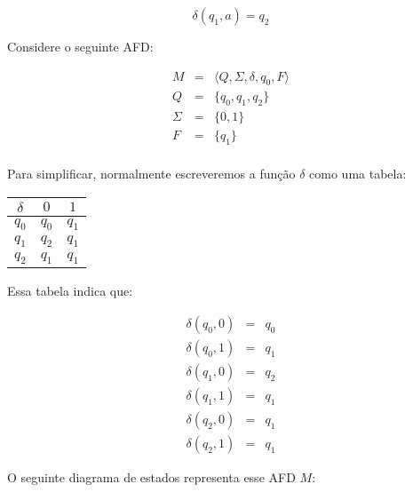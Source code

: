 \begin{center}
\end{center}

\begin{displaymath}
  \delta(q_1, a) = q_2
\end{displaymath}


\begin{example}
  Considere o seguinte AFD:

  \begin{eqnarray*}
    M & = & \langle Q, \Sigma, \delta, q_0, F \rangle\\
    Q & = & \{q_0, q_1, q_2\}\\
    \Sigma & = & \{0,1\}\\
    F & = & \{q_1\}\\
  \end{eqnarray*}

  Para simplificar, normalmente escreveremos a função $\delta$ como uma tabela:

  \begin{center}
  \begin{tabular}{c|cc}
    $\delta$ & $0$ & $1$ \\
    \hline
    $q_0$ & $q_0$ & $q_1$\\
    $q_1$ & $q_2$ & $q_1$\\
    $q_2$ & $q_1$ & $q_1$\\
  \end{tabular}
  \end{center}

Essa tabela indica que:

\begin{eqnarray*}
  \delta(q_0, 0) & = & q_0\\
  \delta(q_0, 1) & = & q_1\\
  \delta(q_1, 0) & = & q_2\\
  \delta(q_1, 1) & = & q_1\\
  \delta(q_2, 0) & = & q_1\\
  \delta(q_2, 1) & = & q_1
\end{eqnarray*}

O seguinte diagrama de estados representa esse AFD $M$:

\begin{center}
\end{center}
\end{example}

